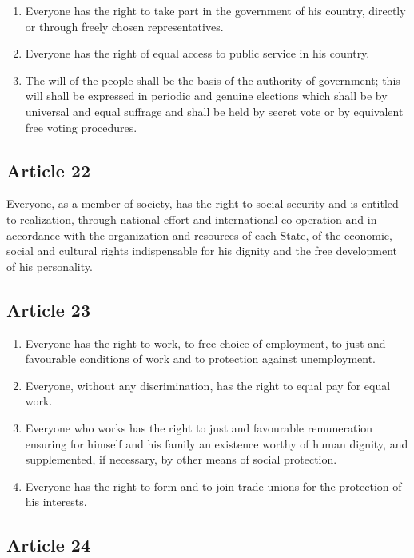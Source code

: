 \documentclass[
  titlepage,
  openright,
  DIV=calc,
  toc=listof,
  listof=nochaptergap]{scrbook}
\begin{document}
\begin{enumerate}
\def\labelenumi{\arabic{enumi}.}
\item
  Everyone has the right to take part in the government of his country,
  directly or through freely chosen representatives.
\item
  Everyone has the right of equal access to public service in his
  country.
\item
  The will of the people shall be the basis of the authority of
  government; this will shall be expressed in periodic and genuine
  elections which shall be by universal and equal suffrage and shall be
  held by secret vote or by equivalent free voting procedures.
\end{enumerate}

\subsection{Article 22}\label{article-22-1}

Everyone, as a member of society, has the right to social security and
is entitled to realization, through national effort and international
co-operation and in accordance with the organization and resources of
each State, of the economic, social and cultural rights indispensable
for his dignity and the free development of his personality.

\subsection{Article 23}\label{article-23-1}

\begin{enumerate}
\def\labelenumi{\arabic{enumi}.}
\item
  Everyone has the right to work, to free choice of employment, to just
  and favourable conditions of work and to protection against
  unemployment.
\item
  Everyone, without any discrimination, has the right to equal pay for
  equal work.
\item
  Everyone who works has the right to just and favourable remuneration
  ensuring for himself and his family an existence worthy of human
  dignity, and supplemented, if necessary, by other means of social
  protection.
\item
  Everyone has the right to form and to join trade unions for the
  protection of his interests.
\end{enumerate}

\subsection{Article 24}\label{article-24-1}
\end{document}
